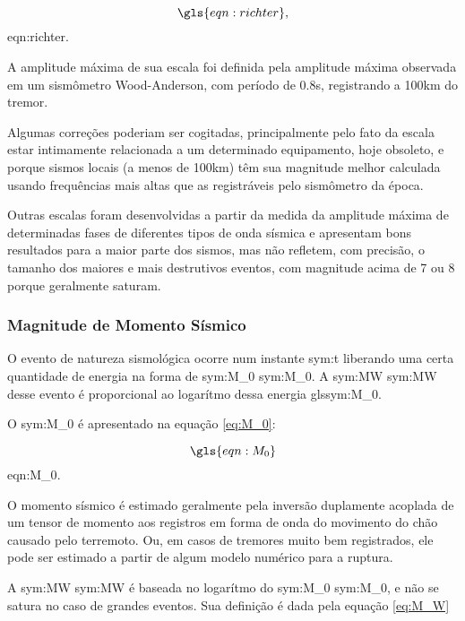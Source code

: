 \begin{equation}
	\gls{eqn:richter},
	\label{eq:richter}
\end{equation}
\glsdesc*{eqn:richter}.


A amplitude máxima de sua
escala foi definida pela amplitude máxima observada em um sismômetro Wood-Anderson, com período de 0.8s, registrando a 100km
do tremor.

Algumas correções poderiam ser cogitadas, principalmente pelo fato da escala estar intimamente
relacionada a um determinado equipamento, hoje obsoleto, e porque sismos locais (a menos de 100km) têm sua magnitude
melhor calculada usando frequências mais altas que as registráveis pelo sismômetro da época.


Outras escalas foram desenvolvidas a partir da medida da amplitude máxima de determinadas fases
de diferentes tipos de onda sísmica e apresentam bons resultados para a maior parte dos sismos,
mas não refletem, com precisão,
o tamanho dos maiores e mais destrutivos eventos, com magnitude acima de 7 ou 8 porque geralmente saturam.


\subsubsection{Magnitude de Momento Sísmico}
\label{sec:risco_sismico}

O evento de natureza sismológica ocorre num
instante \gls{sym:t} liberando uma certa quantidade de energia na forma de \glsdesc{sym:M_0}
\gls{sym:M_0}. A \glsdesc{sym:MW} \gls{sym:MW} desse evento é proporcional ao logarítmo dessa energia gls{sym:M_0}.

O \glsdesc{sym:M_0} é apresentado na equação \eqref{eq:M_0}:

\begin{equation}
	\gls{eqn:M_0}
	\label{eq:M_0}
\end{equation}
\glsdesc*{eqn:M_0}.

O momento sísmico é estimado geralmente pela inversão duplamente acoplada de um tensor de momento aos registros em
forma de onda do movimento do chão causado pelo terremoto. Ou, em casos de tremores muito bem registrados, ele pode
ser estimado a partir de algum modelo numérico para a ruptura.

A \glsdesc{sym:MW} \gls{sym:MW} \citep{hanks_1979} é baseada no
logarítmo do \glsdesc{sym:M_0} \gls{sym:M_0}, e não se satura no caso de grandes eventos.
Sua definição é dada pela equação \eqref{eq:M_W}

